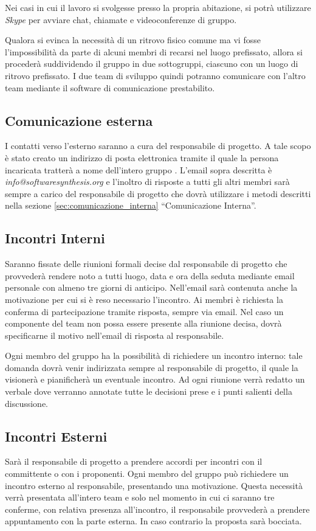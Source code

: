 Nei casi in cui il lavoro si svolgesse presso la propria abitazione, si potrà utilizzare \textit{Skype} per avviare chat, chiamate e videoconferenze di gruppo.

Qualora si evinca la necessità di un ritrovo fisico comune ma vi fosse l'impossibilità da parte di alcuni membri di recarsi nel luogo prefissato, allora si procederà suddividendo il gruppo in due sottogruppi, ciascuno con un luogo di ritrovo prefissato. I due team di sviluppo quindi potranno comunicare con l'altro team mediante il software di comunicazione prestabilito.


\subsection{Comunicazione esterna}
I contatti verso l'esterno saranno a cura del responsabile di progetto. A tale scopo è stato creato un indirizzo di posta elettronica tramite il quale la persona incaricata tratterà a nome dell'intero gruppo \team{}. L'email sopra descritta è \textit{info@softwaresynthesis.org} e l'inoltro di risposte a tutti gli altri membri sarà sempre a carico del responsabile di progetto che dovrà utilizzare i metodi descritti nella sezione \ref{sec:comunicazione_interna} ``Comunicazione Interna''.

\subsection{Incontri Interni}
Saranno fissate delle riunioni formali decise dal responsabile di progetto che provvederà rendere noto a tutti luogo, data e ora della seduta mediante email personale con almeno tre giorni di anticipo. Nell'email sarà contenuta anche la motivazione per cui si è reso necessario l'incontro. Ai membri è richiesta la conferma di partecipazione tramite risposta, sempre via email. Nel caso un componente del team non possa essere presente alla riunione decisa, dovrà specificarne il motivo nell'email di risposta al responsabile.

Ogni membro del gruppo ha la possibilità di richiedere un incontro interno: tale domanda dovrà venir indirizzata sempre al responsabile di progetto, il quale la visionerà e pianificherà un eventuale incontro.
Ad ogni riunione verrà redatto un verbale dove verranno annotate tutte le decisioni prese e i punti salienti della discussione.

\subsection{Incontri Esterni}
Sarà il responsabile di progetto a prendere accordi per incontri con il committente o con i proponenti.
Ogni membro del gruppo può richiedere un incontro esterno al responsabile, presentando una motivazione. Questa necessità verrà presentata all'intero team e solo nel momento in cui ci saranno tre conferme, con relativa presenza all'incontro, il responsabile provvederà a prendere appuntamento con la parte esterna. In caso contrario la proposta sarà bocciata.

